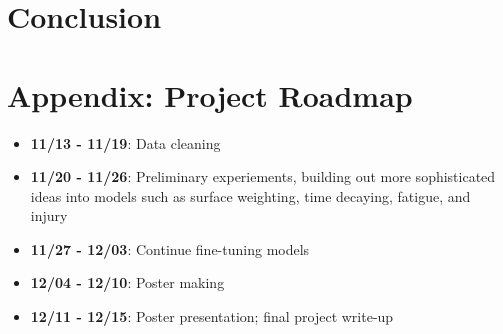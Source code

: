 \documentclass[paper=a4, fontsize=11pt]{scrartcl} %
\numberwithin{equation}{section} %
\numberwithin{figure}{section} %
\numberwithin{table}{section} %
\begin{document}
\section{Conclusion}

\appendix
\section{Appendix: Project Roadmap}
\begin{itemize}
\item \textbf{11/13 - 11/19}: Data cleaning
\item \textbf{11/20 - 11/26}: Preliminary experiements, building out more sophisticated ideas into models such as surface weighting, time decaying, fatigue, and injury
\item \textbf{11/27 - 12/03}: Continue fine-tuning models
\item \textbf{12/04 - 12/10}: Poster making
\item \textbf{12/11 - 12/15}: Poster presentation; final project write-up
\end{itemize}


 
\end{document}
